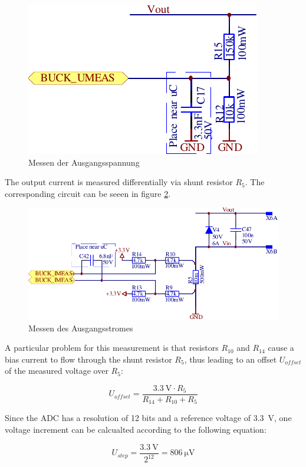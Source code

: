 \begin{figure}[th!]
    \center
    \includegraphics[width=.45\textwidth]{images/circuit/buck-umeas.pdf}
    \caption{Messen der Ausgangsspannung}
    \label{fig:circuit:buck:umeas}
\end{figure}

The output  current is measured  differentially via shunt  resistor $R_5$. The
corresponding circuit can be seeen in figure \ref{fig:circuit:buck:imeas}.

\begin{figure}[th!]
    \center
    \includegraphics[width=.85\textwidth]{images/circuit/buck-imeas.pdf}
    \caption{Messen des Ausgangsstromes}
    \label{fig:circuit:buck:imeas}
\end{figure}

A  particular problem  for this  measurement  is that  resistors $R_{10}$  and
$R_{14}$ cause a  bias current to flow through the  shunt resistor $R_5$, thus
leading to an offset $U_{offset}$ of the measured voltage over $R_5$:

\begin{equation}
    U_{offset} = \frac{ \SI{3.3}{\volt} \cdot R_5 }{ R_{14} + R_{10} + R_5 }
    \label{eq:circuit:buck:shunt_offset}
\end{equation}

Since  the  ADC has  a  resolution  of 12  bits  and  a reference  voltage  of
\SI{3.3}{\volt},  one voltage  increment can  be calcualted  according to  the
following equation:

\begin{equation}
    U_{step} = \frac{\SI{3.3}{\volt}}{2^{12}} = \SI{806}{\micro\volt}
    \label{eq:circuit:buck:adc_step}
\end{equation}

